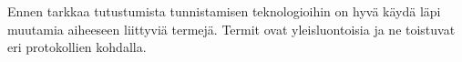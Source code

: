 Ennen tarkkaa tutustumista tunnistamisen teknologioihin on hyvä käydä läpi muutamia aiheeseen liittyviä termejä. Termit ovat yleisluontoisia ja ne toistuvat eri protokollien kohdalla.